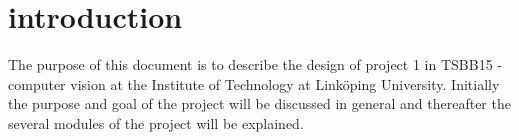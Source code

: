 \section{introduction}

The purpose of this document is to describe the design of project 1 in TSBB15 - computer vision at the  Institute of Technology at Linköping University. Initially the purpose and goal of the project will be discussed in general and thereafter the several modules of the project will be explained.